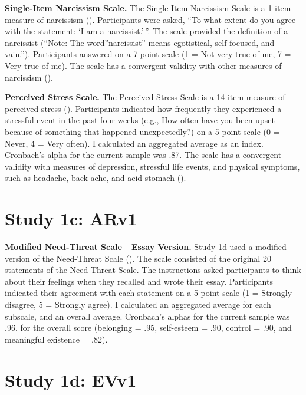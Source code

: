 \documentclass[
]{udthesis}
\begin{document}
\textbf{Single-Item Narcissism Scale.} The Single-Item Narcissism Scale is a 1-item measure of narcissism (). Participants were asked, ``To what extent do you agree with the statement: `I am a narcissist.'\,''. The scale provided the definition of a narcissist (``Note: The word''narcissist'' means egotistical, self-focused, and vain.''). Participants answered on a 7-point scale (1 = Not very true of me, 7 = Very true of me). The scale has a convergent validity with other measures of narcissism ().

\textbf{Perceived Stress Scale.} The Perceived Stress Scale is a 14-item measure of perceived stress (). Participants indicated how frequently they experienced a stressful event in the past four weeks (e.g., How often have you been upset because of something that happened unexpectedly?) on a 5-point scale (0 = Never, 4 = Very often). I calculated an aggregated average as an index. Cronbach's alpha for the current sample was .87. The scale has a convergent validity with measures of depression, stressful life events, and physical symptoms, such as headache, back ache, and acid stomach ().

\section{Study 1c: ARv1}\label{study-1c-arv1-1}

\textbf{Modified Need-Threat Scale---Essay Version.} Study 1d used a modified version of the Need-Threat Scale (). The scale consisted of the original 20 statements of the Need-Threat Scale. The instructions asked participants to think about their feelings when they recalled and wrote their essay. Participants indicated their agreement with each statement on a 5-point scale (1 = Strongly disagree, 5 = Strongly agree). I calculated an aggregated average for each subscale, and an overall average. Cronbach's alphas for the current sample was .96. for the overall score (belonging = .95, self-esteem = .90, control = .90, and meaningful existence = .82).

\section{Study 1d: EVv1}\label{study-1d-evv1-1}
\end{document}
